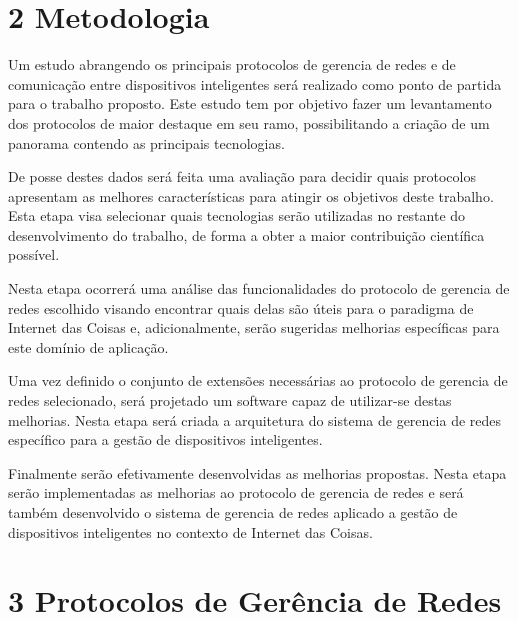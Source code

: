 \documentclass[twoside,english,brazilian]{UNISINOSmonografia}
\begin{document}
\chapter{2 Metodologia}

	Um estudo abrangendo os principais protocolos de gerencia de redes e de 
	comunicação entre dispositivos inteligentes será realizado como ponto de 
	partida para o trabalho proposto. Este estudo tem por objetivo fazer um 
	levantamento dos protocolos de maior destaque em seu ramo, possibilitando 
	a 
	criação de um panorama contendo as principais tecnologias.
	
	De posse destes dados será feita uma avaliação para decidir quais 
	protocolos 
	apresentam as melhores características para atingir os objetivos deste 
	trabalho. Esta etapa visa selecionar quais tecnologias serão utilizadas no 
	restante do desenvolvimento do trabalho, de forma a obter a maior 
	contribuição 
	científica possível.
	
	Nesta etapa ocorrerá uma análise das funcionalidades do protocolo de 
	gerencia 
	de redes escolhido visando encontrar quais delas são úteis para o 
	paradigma de 
	Internet das Coisas e, adicionalmente, serão sugeridas melhorias 
	específicas 
	para este domínio de aplicação.
	
	Uma vez definido o conjunto de extensões necessárias ao protocolo de 
	gerencia 
	de redes selecionado, será projetado um software capaz de utilizar-se 
	destas 
	melhorias. Nesta etapa será criada a arquitetura do sistema de gerencia de 
	redes específico para a gestão de dispositivos inteligentes.
	
	Finalmente serão efetivamente desenvolvidas as melhorias propostas. Nesta 
	etapa serão implementadas as melhorias ao protocolo de gerencia de redes e 
	será também desenvolvido o sistema de gerencia de redes aplicado a gestão 
	de 
	dispositivos inteligentes no contexto de Internet das Coisas.


\chapter{3 Protocolos de Gerência de Redes}

\end{document}
